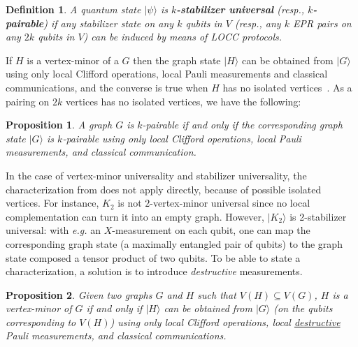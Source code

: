\documentclass[10pt,a4paper]{article}
\newtheorem{definition}{Definition}[section]
\newtheorem{proposition}{Proposition}[section]
\newcommand{\ket}[1]{{\ensuremath{\lvert#1\rangle}}}
\newcommand{\se}{\subseteq}
\begin{document}
\begin{definition}
A quantum state $\ket{\psi}$ is \textbf{$k$-stabilizer universal} (resp., \textbf{$k$-pairable}) if any stabilizer state on any $k$ qubits in $V$ (resp., any $k$ EPR pairs on any $2k$ qubits in $V$) can be induced by means of LOCC protocols. 
\end{definition}

If $H$ is a vertex-minor of a $G$ then the graph state $\ket{H}$ can be obtained from $\ket G$ using only local Clifford operations, local Pauli measurements and classical communications, and the converse is true when $H$ has no isolated vertices~\cite{DWH:transfo}. As a pairing on $2k$ vertices has no isolated vertices, we have the following:

\begin{proposition}
    A graph $G$ is $k$-pairable if and only if the corresponding graph state $\ket G$ is $k$-pairable using only local Clifford operations, local Pauli measurements, and classical communication.
\end{proposition}

In the case of vertex-minor universality and stabilizer universality, the characterization from \cite{DWH:transfo} does not apply directly, because of possible isolated vertices. For instance, $K_2$ is not $2$-vertex-minor universal since no local complementation can turn it into an empty graph. However, $\ket{K_2}$ is 2-stabilizer universal: with \emph{e.g.} an $X$-measurement on each qubit, one can map the corresponding graph state (a maximally entangled pair of qubits) to the graph state composed a tensor product of two qubits. To be able to state a characterization, a solution is to introduce \emph{destructive} measurements.

\begin{proposition}\label{prop:vm}
   Given two graphs $G$ and $H$ such that $V(H) \se V(G)$, $H$ is a vertex-minor of $G$ if and only if $\ket H$ can be obtained from $\ket G$ (on the qubits corresponding to $V(H)$) using only local Clifford operations, local \underline{destructive} Pauli measurements, and classical communications.    
\end{proposition}
\end{document}

